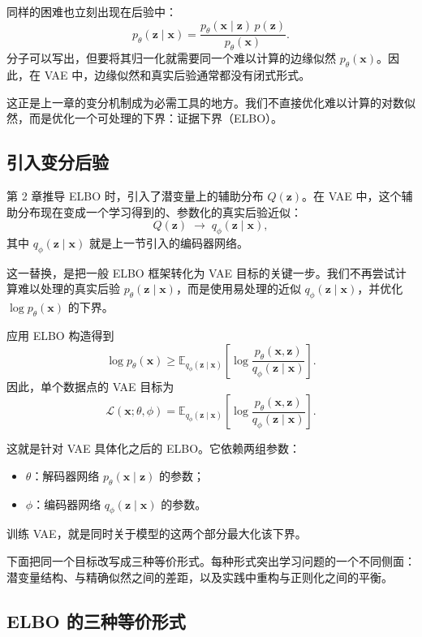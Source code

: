 同样的困难也立刻出现在后验中：
\[
p_{\theta}(\mathbf{z}\mid\mathbf{x})
=
\frac{p_{\theta}(\mathbf{x}\mid\mathbf{z})\,p(\mathbf{z})}
{p_{\theta}(\mathbf{x})}.
\]
分子可以写出，但要将其归一化就需要同一个难以计算的边缘似然 \(p_{\theta}(\mathbf{x})\)。因此，在 VAE 中，边缘似然和真实后验通常都没有闭式形式。

这正是上一章的变分机制成为必需工具的地方。我们不直接优化难以计算的对数似然，而是优化一个可处理的下界：证据下界（ELBO）。

\subsection{引入变分后验}

第 2 章推导 ELBO 时，引入了潜变量上的辅助分布 \(Q(\mathbf{z})\)。在 VAE 中，这个辅助分布现在变成一个学习得到的、参数化的真实后验近似：
\[
Q(\mathbf{z})
\;\longrightarrow\;
q_{\phi}(\mathbf{z}\mid\mathbf{x}),
\]
其中 \(q_{\phi}(\mathbf{z}\mid\mathbf{x})\) 就是上一节引入的编码器网络。

这一替换，是把一般 ELBO 框架转化为 VAE 目标的关键一步。我们不再尝试计算难以处理的真实后验 \(p_{\theta}(\mathbf{z}\mid\mathbf{x})\)，而是使用易处理的近似 \(q_{\phi}(\mathbf{z}\mid\mathbf{x})\)，并优化 \(\log p_{\theta}(\mathbf{x})\) 的下界。

应用 ELBO 构造得到
\[
\log p_{\theta}(\mathbf{x})
\geq
\mathbb{E}_{q_{\phi}(\mathbf{z}\mid\mathbf{x})}
\!\left[
\log\frac{p_{\theta}(\mathbf{x},\mathbf{z})}
{q_{\phi}(\mathbf{z}\mid\mathbf{x})}
\right].
\]
因此，单个数据点的 VAE 目标为
\[
\mathcal{L}(\mathbf{x};\theta,\phi)
=
\mathbb{E}_{q_{\phi}(\mathbf{z}\mid\mathbf{x})}
\!\left[
\log\frac{p_{\theta}(\mathbf{x},\mathbf{z})}
{q_{\phi}(\mathbf{z}\mid\mathbf{x})}
\right].
\]

这就是针对 VAE 具体化之后的 ELBO。它依赖两组参数：
\begin{itemize}
    \item \(\theta\)：解码器网络 \(p_{\theta}(\mathbf{x}\mid\mathbf{z})\) 的参数；
    \item \(\phi\)：编码器网络 \(q_{\phi}(\mathbf{z}\mid\mathbf{x})\) 的参数。
\end{itemize}
训练 VAE，就是同时关于模型的这两个部分最大化该下界。

下面把同一个目标改写成三种等价形式。每种形式突出学习问题的一个不同侧面：潜变量结构、与精确似然之间的差距，以及实践中重构与正则化之间的平衡。

\subsection{ELBO 的三种等价形式}

